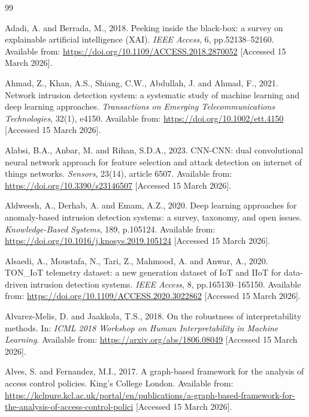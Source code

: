 \documentclass[12pt,a4paper]{report}
\begin{document}
\begin{thebibliography}{99}

Adadi, A. and Berrada, M., 2018. Peeking inside the black-box: a survey on explainable artificial intelligence (XAI). \textit{IEEE Access}, 6, pp.52138--52160. Available from: \url{https://doi.org/10.1109/ACCESS.2018.2870052} [Accessed 15 March 2026].

Ahmad, Z., Khan, A.S., Shiang, C.W., Abdullah, J. and Ahmad, F., 2021. Network intrusion detection system: a systematic study of machine learning and deep learning approaches. \textit{Transactions on Emerging Telecommunications Technologies}, 32(1), e4150. Available from: \url{https://doi.org/10.1002/ett.4150} [Accessed 15 March 2026].

Alabsi, B.A., Anbar, M. and Rihan, S.D.A., 2023. CNN-CNN: dual convolutional neural network approach for feature selection and attack detection on internet of things networks. \textit{Sensors}, 23(14), article 6507. Available from: \url{https://doi.org/10.3390/s23146507} [Accessed 15 March 2026].

Aldweesh, A., Derhab, A. and Emam, A.Z., 2020. Deep learning approaches for anomaly-based intrusion detection systems: a survey, taxonomy, and open issues. \textit{Knowledge-Based Systems}, 189, p.105124. Available from: \url{https://doi.org/10.1016/j.knosys.2019.105124} [Accessed 15 March 2026].

Alsaedi, A., Moustafa, N., Tari, Z., Mahmood, A. and Anwar, A., 2020. TON\_IoT telemetry dataset: a new generation dataset of IoT and IIoT for data-driven intrusion detection systems. \textit{IEEE Access}, 8, pp.165130--165150. Available from: \url{https://doi.org/10.1109/ACCESS.2020.3022862} [Accessed 15 March 2026].

Alvarez-Melis, D. and Jaakkola, T.S., 2018. On the robustness of interpretability methods. In: \textit{ICML 2018 Workshop on Human Interpretability in Machine Learning}. Available from: \url{https://arxiv.org/abs/1806.08049} [Accessed 15 March 2026].

Alves, S. and Fernandez, M.I., 2017. A graph-based framework for the analysis of access control policies. King's College London. Available from: \url{https://kclpure.kcl.ac.uk/portal/en/publications/a-graph-based-framework-for-the-analysis-of-access-control-polici} [Accessed 15 March 2026].


\end{thebibliography}
\end{document}
